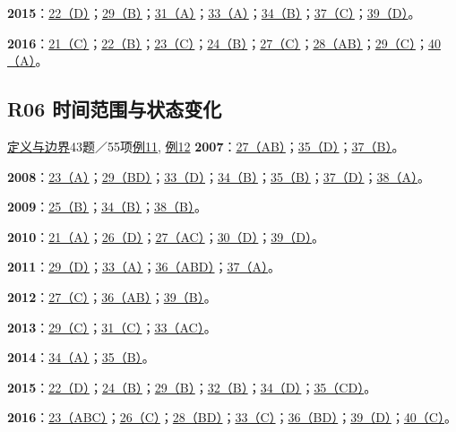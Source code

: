 \documentclass[11pt,a4paper]{article}
\begin{document}
\noindent\textbf{2015}：\hyperref[idx-2015-T1-Q22]{22（D）}；\hyperref[idx-2015-T2-Q29]{29（B）}；\hyperref[idx-2015-T3-Q31]{31（A）}；\hyperref[idx-2015-T3-Q33]{33（A）}；\hyperref[idx-2015-T3-Q34]{34（B）}；\hyperref[idx-2015-T4-Q37]{37（C）}；\hyperref[idx-2015-T4-Q39]{39（D）}。\par
\noindent\textbf{2016}：\hyperref[idx-2016-T1-Q21]{21（C）}；\hyperref[idx-2016-T1-Q22]{22（B）}；\hyperref[idx-2016-T1-Q23]{23（C）}；\hyperref[idx-2016-T1-Q24]{24（B）}；\hyperref[idx-2016-T2-Q27]{27（C）}；\hyperref[idx-2016-T2-Q28]{28（AB）}；\hyperref[idx-2016-T2-Q29]{29（C）}；\hyperref[idx-2016-T4-Q40]{40（A）}。\par
{}
\subsection{R06 时间范围与状态变化}\label{class-R06}
\noindent \hyperref[cat-R06]{定义与边界}\quad 43题／55项\quad \hyperref[case-2010-T2-Q26]{例11}, \hyperref[case-2012-T4-Q36]{例12}
\noindent\textbf{2007}：\hyperref[idx-2007-T2-Q27]{27（AB）}；\hyperref[idx-2007-T3-Q35]{35（D）}；\hyperref[idx-2007-T4-Q37]{37（B）}。\par
\noindent\textbf{2008}：\hyperref[idx-2008-T1-Q23]{23（A）}；\hyperref[idx-2008-T2-Q29]{29（BD）}；\hyperref[idx-2008-T3-Q33]{33（D）}；\hyperref[idx-2008-T3-Q34]{34（B）}；\hyperref[idx-2008-T3-Q35]{35（B）}；\hyperref[idx-2008-T4-Q37]{37（D）}；\hyperref[idx-2008-T4-Q38]{38（A）}。\par
\noindent\textbf{2009}：\hyperref[idx-2009-T1-Q25]{25（B）}；\hyperref[idx-2009-T3-Q34]{34（B）}；\hyperref[idx-2009-T4-Q38]{38（B）}。\par
\noindent\textbf{2010}：\hyperref[idx-2010-T1-Q21]{21（A）}；\hyperref[idx-2010-T2-Q26]{26（D）}；\hyperref[idx-2010-T2-Q27]{27（AC）}；\hyperref[idx-2010-T2-Q30]{30（D）}；\hyperref[idx-2010-T4-Q39]{39（D）}。\par
\noindent\textbf{2011}：\hyperref[idx-2011-T2-Q29]{29（D）}；\hyperref[idx-2011-T3-Q33]{33（A）}；\hyperref[idx-2011-T4-Q36]{36（ABD）}；\hyperref[idx-2011-T4-Q37]{37（A）}。\par
\noindent\textbf{2012}：\hyperref[idx-2012-T2-Q27]{27（C）}；\hyperref[idx-2012-T4-Q36]{36（AB）}；\hyperref[idx-2012-T4-Q39]{39（B）}。\par
\noindent\textbf{2013}：\hyperref[idx-2013-T2-Q29]{29（C）}；\hyperref[idx-2013-T3-Q31]{31（C）}；\hyperref[idx-2013-T3-Q33]{33（AC）}。\par
\noindent\textbf{2014}：\hyperref[idx-2014-T3-Q34]{34（A）}；\hyperref[idx-2014-T3-Q35]{35（B）}。\par
\noindent\textbf{2015}：\hyperref[idx-2015-T1-Q22]{22（D）}；\hyperref[idx-2015-T1-Q24]{24（B）}；\hyperref[idx-2015-T2-Q29]{29（B）}；\hyperref[idx-2015-T3-Q32]{32（B）}；\hyperref[idx-2015-T3-Q34]{34（D）}；\hyperref[idx-2015-T3-Q35]{35（CD）}。\par
\noindent\textbf{2016}：\hyperref[idx-2016-T1-Q23]{23（ABC）}；\hyperref[idx-2016-T2-Q26]{26（C）}；\hyperref[idx-2016-T2-Q28]{28（BD）}；\hyperref[idx-2016-T3-Q33]{33（C）}；\hyperref[idx-2016-T4-Q36]{36（BD）}；\hyperref[idx-2016-T4-Q39]{39（D）}；\hyperref[idx-2016-T4-Q40]{40（C）}。\par
{}
\end{document}

